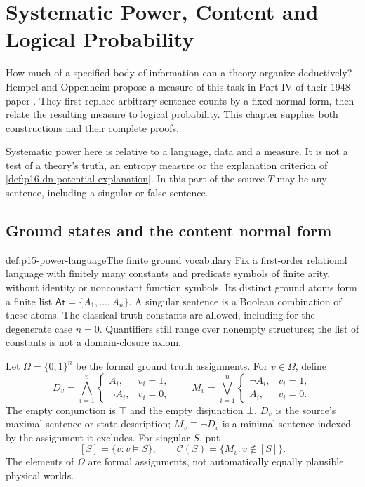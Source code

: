 \chapter{Systematic Power, Content and Logical Probability}
\label{sec:p15-systematic-power}

How much of a specified body of information can a theory
organize deductively? Hempel and Oppenheim propose a
measure of this task in Part IV of their 1948 paper
\cite[pp.~164--173]{HempelOppenheim1948Explanation}.
They first replace arbitrary sentence counts by a
fixed normal form, then relate the resulting measure
to logical probability. This chapter supplies both
constructions and their complete proofs.

Systematic power here is relative to a language,
data and a measure. It is not a test of a theory's
truth, an entropy measure or the explanation criterion
of \cref{def:p16-dn-potential-explanation}.
In this part of the source \(T\) may be any sentence,
including a singular or false sentence.

\section{Ground states and the content normal form}
\label{sec:p15-power-normal-forms}

\begin{hbdefinition}{def:p15-power-language}{The finite ground vocabulary}
Fix a first-order relational language with finitely
many constants and predicate symbols of finite arity,
without identity or nonconstant function symbols.
Its distinct ground atoms form a finite list
\(\mathsf{At}=\{A_1,\ldots,A_n\}\).
A singular sentence is a Boolean combination of
these atoms. The classical truth constants are
allowed, including for the degenerate case \(n=0\).
Quantifiers still range over nonempty structures;
the list of constants is not a domain-closure axiom.

Let \(\Omega=\{0,1\}^n\) be the formal ground
truth assignments. For \(v\in\Omega\), define
\[
 D_v=\bigwedge_{i=1}^n
       \begin{cases}A_i,&v_i=1,\\\neg A_i,&v_i=0,\end{cases}
 \qquad
 M_v=\bigvee_{i=1}^n
       \begin{cases}\neg A_i,&v_i=1,\\A_i,&v_i=0.\end{cases}
\]
The empty conjunction is \(\top\) and the empty
disjunction \(\bot\).
\(D_v\) is the source's maximal sentence or
state description; \(M_v\equiv\neg D_v\) is a
minimal sentence indexed by the assignment
it excludes.
For singular \(S\), put
\[
 [S]=\{v:v\models S\},\qquad
 \mathcal C(S)=\{M_v:v\notin[S]\}.
\]
The elements of \(\Omega\) are formal assignments,
not automatically equally plausible physical worlds.
\end{hbdefinition}

